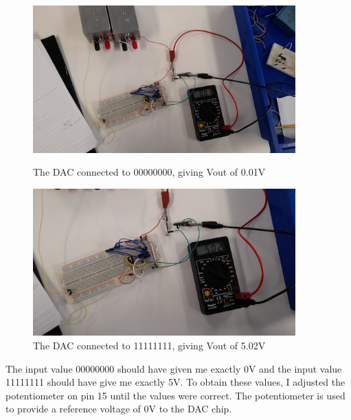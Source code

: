 \begin{figure}[H]
    \centering
    \begin{minipage}[t]{0.45\textwidth}
        \centering
        \includegraphics[width=0.9\textwidth]{images/dacTesting1.jpg}
        \caption{The DAC connected to 00000000, giving Vout of 0.01V}
        \label{fig:dacTesting1}
    \end{minipage}\hfill
    \begin{minipage}[t]{0.45\textwidth}
        \centering
        \includegraphics[width=0.9\textwidth]{images/dacTesting2.jpg}
        \caption{The DAC connected to 11111111, giving Vout of 5.02V}
        \label{fig:dacTesting2}
    \end{minipage}
\end{figure}
\noindent The input value 00000000 should have given me exactly 0V and the input value 11111111 should have give me exactly 5V. To obtain these values, I adjusted the potentiometer on pin 15 until the values were correct. The potentiometer is used to provide a reference voltage of 0V to the DAC chip.
